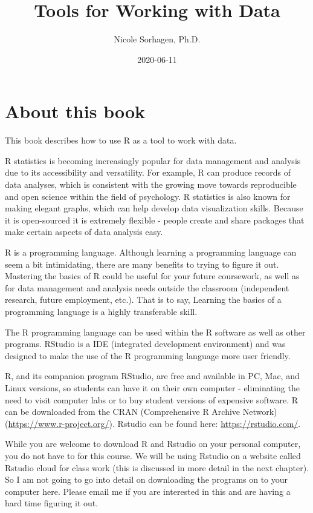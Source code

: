 \documentclass[
]{book}
\title{Tools for Working with Data}
\author{Nicole Sorhagen, Ph.D.}
\date{2020-06-11}
\begin{document}
\maketitle

{
\setcounter{tocdepth}{1}
\tableofcontents
}
\hypertarget{about-this-book}{%
\chapter{About this book}\label{about-this-book}}

This book describes how to use R as a tool to work with data.

R statistics is becoming increasingly popular for data management and analysis due to its accessibility and versatility. For example, R can produce records of data analyses, which is consistent with the growing move towards reproducible and open science within the field of psychology. R statistics is also known for making elegant graphs, which can help develop data visualization skills. Because it is open-sourced it is extremely flexible - people create and share packages that make certain aspects of data analysis easy.

R is a programming language. Although learning a programming language can seem a bit intimidating, there are many benefits to trying to figure it out. Mastering the basics of R could be useful for your future coursework, as well as for data management and analysis needs outside the classroom (independent research, future employment, etc.). That is to say, Learning the basics of a programming language is a highly transferable skill.

The R programming language can be used within the R software as well as other programs. RStudio is a IDE (integrated development environment) and was designed to make the use of the R programming language more user friendly.

R, and its companion program RStudio, are free and available in PC, Mac, and Linux versions, so students can have it on their own computer - eliminating the need to visit computer labs or to buy student versions of expensive software. R can be downloaded from the CRAN (Comprehensive R Archive Network) (\url{https://www.r-project.org/}). Rstudio can be found here: \url{https://rstudio.com/}.

While you are welcome to download R and Rstudio on your personal computer, you do not have to for this course. We will be using Rstudio on a website called Rstudio cloud for class work (this is discussed in more detail in the next chapter). So I am not going to go into detail on downloading the programs on to your computer here. Please email me if you are interested in this and are having a hard time figuring it out.
\end{document}
